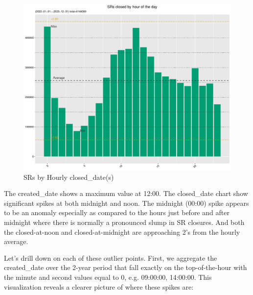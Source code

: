 \documentclass[12pt, titlepage]{article}
\begin{document}
{	\begin{figure}[tbp]
		\centering
		\includegraphics[width = \textwidth]{Closed_Hourly_SR_count.pdf}
		\caption{SRs by Hourly closed\_date(s)}
		\label{fig:hourly-closed}
	\end{figure}	
	
	The created\_date shows a maximum value at 12:00. The closed\_date chart show significant spikes at both midnight
	and noon. The midnight (00:00) spike appears to be an anomaly especially as compared to the hours just 
	before and after midnight where there is normally a pronounced slump in SR closures. 
	And both the closed-at-noon and closed-at-midnight are approaching 2\textsigma's from the hourly average. 

	Let's drill down on each of these outlier points. First, we aggregate the created\_date over the 2-year period that fall exactly
	on the top-of-the-hour with the minute and second values equal to 0, e.g. 09:00:00, 14:00:00. This visualization
	reveals a clearer picture of where these spikes are:
	
}
\end{document}
